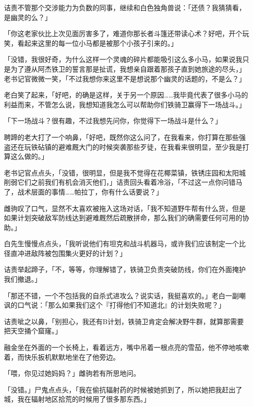 诘责不管那个交涉能力为负数的同事，继续和白色独角兽说：「还债？我猜猜看，是幽灵的么？」

「你这老家伙比上次见面厉害多了，难道你那长者斗篷还带读心术？好吧，开个玩笑，看起来这里的每一位小马都是被那个小孩子引来的。」

「没错，我很好奇，为什么这样一个灵魂的碎片都能吸引这么多小马，如果说我只是为了遵从阿杰铁卫的誓言那是扯谎，我想亲自跟着那孩子直到她旅途的尽头，」老书记官微微一笑，「不过我想你来这里不是想说那个幽灵的话题的，不是么？」

老白笑了起来，「好吧，的确是这样，关于另一个原因……我毕竟代表了很多小马的利益而来，不管怎么说，我想知道我怎么可以帮助你们铁骑卫赢得下一场战斗。」

「下一场战斗？很有趣，不过我想先问你，你觉得下一场战斗是什么？」

聘蹄的老大打了一个响鼻，「好吧，既然你这么问了，在我看来，你打算在那些强盗还在玩铁砧镇的避难厩大门的时候突袭那些歹徒，在我看来很明显，至少我是打算这么做的。」

老书记官点点头，「没错，很明显，但是我不觉得在花椰菜镇，铁锈庄园和太阳城削弱它们之前我们有机会消灭他们，」诘责回头看着冷浴，「不过这一点你问错马了，战术层面的事情……帕拉丁，你有什么话要说？」

雌驹叹了口气，显然不太喜欢被拖入这场对话，「我不知道野牛帮有什么货，但是如果计划突破敌军防线达到避难厩然后疏散拼命，那么我们的确需要任何可用的协助。」

白先生慢慢点点头，「我听说他们有坦克和战斗机器马，或许我们应该制定一个比径直冲进敌阵被包围集火更好的计划？」

诘责举起蹄子，「不，等等，你理解错了，铁骑卫负责突破防线，你们在外面掩护我们撤退。」

「那还不错，一个不包括我的自杀式进攻么？说实话，我挺喜欢的。」老白一副嘲讽的口气说：「那么如果我们这个『打得他们不知道北』的计划失败呢？」

诘责呲之以鼻，「别担心，我还有B计划，铁骑卫肯定会解决野牛群，就算那需要把天空捅个窟窿。」

\horizonline


融金坐在外面的一个长椅上，看着远方，嘴中吊着一根点亮的雪茄，他不停地咳嗽着，而快乐扳机默默地坐在了他旁边。

「喂，你见过她妈妈？」雌驹若有所思地问。

「没错。」尸鬼点点头，「我在偷抗辐射药的时候被她抓到了，所以她把我赶出了城，我在辐射地区拾荒的时候用了很多那东西。」

